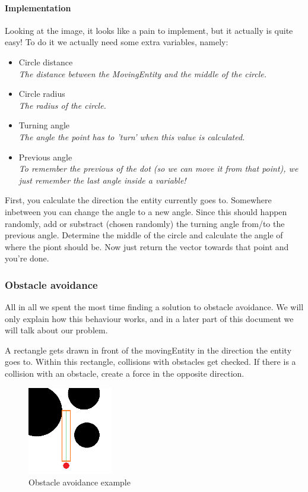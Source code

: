 \documentclass[11pt]{extarticle}
\begin{document}
    \paragraph{Implementation}
    Looking at the image, it looks like a pain to implement, but it actually is quite easy!
    To do it we actually need some extra variables, namely:
    \begin{itemize}
        \item Circle distance
        \\\textit{The distance between the MovingEntity and the middle of the circle.}
        \item Circle radius
        \\\textit{The radius of the circle.}
        \item Turning angle
        \\\textit{The angle the point has to 'turn' when this value is calculated.}
        \item Previous angle
        \\\textit{To remember the previous of the dot (so we can move it from that point), we just remember the last angle inside a variable!}
    \end{itemize}
    First, you calculate the direction the entity currently goes to.
    Somewhere inbetween you can change the angle to a new angle.
    Since this should happen randomly, add or substract (chosen randomly) the turning angle from/to the previous angle.
    Determine the middle of the circle and calculate the angle of where the piont should be.
    Now just return the vector towards that point and you're done.
    
    \subsubsection{Obstacle avoidance}
    All in all we spent the most time finding a solution to obstacle avoidance.
    We will only explain how this behaviour works, and in a later part of this document we will talk about our problem.
    
    A rectangle gets drawn in front of the movingEntity in the direction the entity goes to.
    Within this rectangle, collisions with obstacles get checked.
    If there is a collision with an obstacle, create a force in the opposite direction.
    
    \begin{figure}[h!]
        \begin{center}
            \includegraphics[width=10em]{ObstacleAvoidance.png}
        \end{center}
        \caption{Obstacle avoidance example}

        \label{fig:ObstacleAvoidanceExplanation}
    \end{figure}
\end{document}
